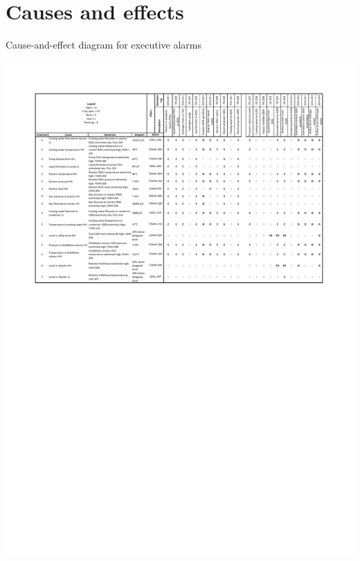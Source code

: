 \section{Causes and effects}



\begin{table}[h]
\label{tab:causeandeffects}
  \caption{Cause-and-effect diagram for executive alarms}
\includegraphics[clip, trim=1cm 15cm 1cm 0cm, width=\linewidth]{chapters/4-operation-control/4-Figures/Cause-and-effects.pdf}
\end{table}